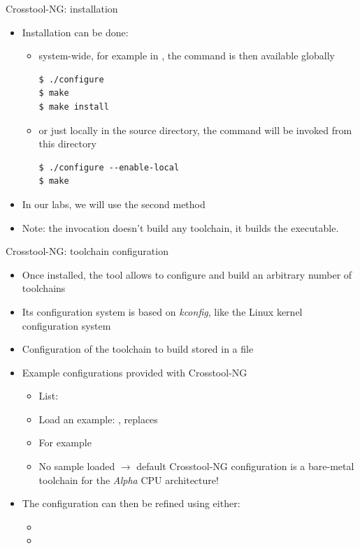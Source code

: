 \begin{frame}[fragile]{Crosstool-NG: installation}
  \begin{itemize}
  \item Installation can be done:
    \begin{itemize}
    \item system-wide, for example in , the
       command is then available globally
\begin{verbatim}
$ ./configure
$ make
$ make install
\end{verbatim}
    \item or just locally in the source directory, the 
      command will be invoked from this directory
\begin{verbatim}
$ ./configure --enable-local
$ make
\end{verbatim}
    \end{itemize}
  \item In our labs, we will use the second method
  \item Note: the  invocation doesn't build any toolchain,
    it builds the  executable.
  \end{itemize}
\end{frame}

\begin{frame}{Crosstool-NG: toolchain configuration}
  \begin{itemize}
  \item Once installed, the  tool allows to configure and
    build an arbitrary number of toolchains
  \item Its configuration system is based on {\em kconfig}, like the
    Linux kernel configuration system
  \item Configuration of the toolchain to build stored in a
     file
  \item Example configurations provided with Crosstool-NG
    \begin{itemize}
    \item List: 
    \item Load an example: , replaces 
    \item For example 
    \item No sample loaded
      $\rightarrow$ default Crosstool-NG configuration is a bare-metal
      toolchain for the {\em Alpha} CPU architecture!
    \end{itemize}
  \item The configuration can then be refined using either:
    \begin{itemize}
    \item {}
    \item {}
    \end{itemize}
  \end{itemize}
\end{frame}

